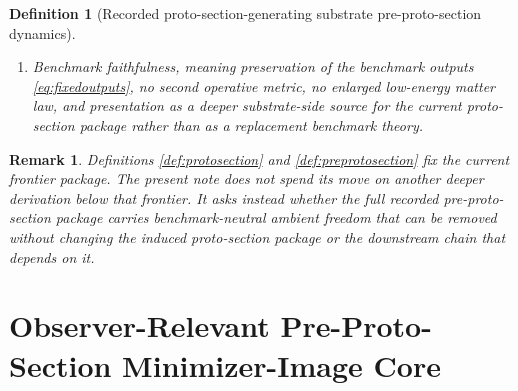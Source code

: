\documentclass[11pt]{article}
\newcommand{\ProtoSectionShell}[1]{\mathcal Z_{#1}^{\mathrm{psec}}}
\newcommand{\PreProtoSectionBody}[1]{\mathcal B_{#1}^{\mathrm{ppsec}}}
\newcommand{\PreProtoSectionProj}[1]{\Pi_{#1}^{\mathrm{ppsec}}}
\newcommand{\PreProtoSectionFiber}[2]{\mathcal F_{#1}^{\mathrm{ppsec}}(#2)}
\newcommand{\PreProtoSectionFunctional}[1]{\mathscr F_{#1}^{\mathrm{ppsec}}}
\newcommand{\PreProtoSectionShell}[1]{\mathcal Z_{#1}^{\mathrm{ppsec}}}
\newtheorem{definition}{Definition}
\newtheorem{remark}{Remark}
\begin{document}
\begin{definition}[Recorded proto-section-generating substrate pre-proto-section dynamics]
\begin{enumerate}
\[    =
    \left\{
    u\in\PreProtoSectionBody{\sigma}:
    \begin{array}{l}
    \PreProtoSectionProj{\sigma}(u)\in\ProtoSectionShell{\sigma},\\[0.2em]
    \PreProtoSectionFunctional{\sigma}(u)
    =
    \displaystyle\min_{v\in\PreProtoSectionFiber{\sigma}{\PreProtoSectionProj{\sigma}(u)}}
    \PreProtoSectionFunctional{\sigma}(v)
    \end{array}
    \right\},
    \]
    and
    \[
    \PreProtoSectionProj{\sigma}\big|_{\PreProtoSectionShell{\sigma}}
    :
    \PreProtoSectionShell{\sigma}
    \xrightarrow{\cong}
    \ProtoSectionShell{\sigma}
    \]
    is a diffeomorphism.
    \item Benchmark faithfulness, meaning preservation of the benchmark outputs \eqref{eq:fixedoutputs}, no second operative metric, no enlarged low-energy matter law, and presentation as a deeper substrate-side source for the current proto-section package rather than as a replacement benchmark theory.
\end{enumerate}
\end{definition}

\begin{remark}
Definitions \ref{def:protosection} and \ref{def:preprotosection} fix the current frontier package. The present note does not spend its move on another deeper derivation below that frontier. It asks instead whether the full recorded pre-proto-section package carries benchmark-neutral ambient freedom that can be removed without changing the induced proto-section package or the downstream chain that depends on it.
\end{remark}

\section{Observer-Relevant Pre-Proto-Section Minimizer-Image Core}
\end{document}
